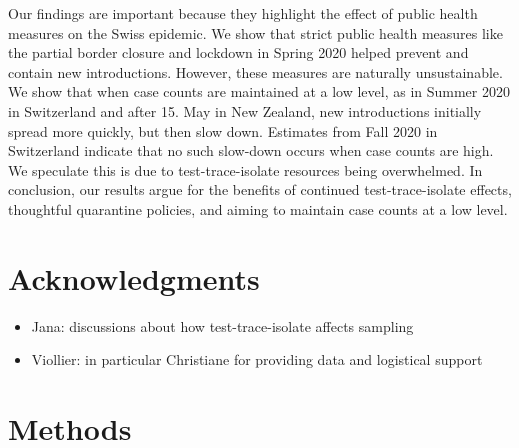 \documentclass[9pt,twoside,lineno]{pnas-new} %
\begin{document}
Our findings are important because they highlight the effect of public health measures on the Swiss epidemic. We show that strict public health measures like the partial border closure and lockdown in Spring 2020 helped prevent and contain new introductions. However, these measures are naturally unsustainable. We show that when case counts are maintained at a low level, as in Summer 2020 in Switzerland and after 15. May in New Zealand, new introductions initially spread more quickly, but then slow down. Estimates from Fall 2020 in Switzerland indicate that no such slow-down occurs when case counts are high. We speculate this is due to test-trace-isolate resources being overwhelmed. In conclusion, our results argue for the benefits of continued test-trace-isolate effects, thoughtful quarantine policies, and aiming to maintain case counts at a low level.

\section{Acknowledgments}

\begin{itemize}
    \item Jana: discussions about how test-trace-isolate affects sampling
    \item Viollier: in particular Christiane for providing data and logistical support
\end{itemize}

\section{Methods}
\end{document}

